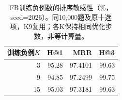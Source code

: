 \begin{table}[htbp]
\caption{FB训练负例数的排序敏感性（\%，seed=2026）。同10,000题及原十选项，K9复用；各K保持相同优化步数，非等计算量。}
\label{tab:fb-k-sensitivity}
\centering\small
\begin{tabular}{rrrr}
\toprule
训练负例$K$ & H@1 & MRR & H@3 \\
\midrule
3 & 95.28 & 97.4101 & 99.63 \\
9 & 94.85 & 97.2499 & 99.75 \\
15 & 95.03 & 97.3181 & 99.63 \\
\bottomrule
\end{tabular}
\end{table}
